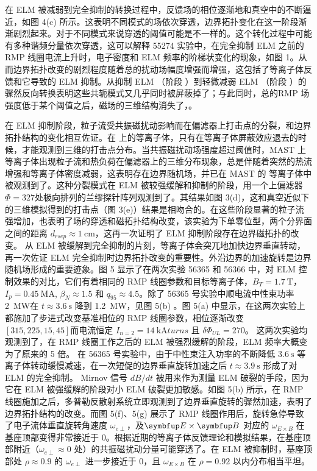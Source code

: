 在 ELM 被减弱到完全抑制的转换过程中，反馈场的相位逐渐地和真空中的不断逼近，如图 4(c) 所示。这表明不同模式的场依次穿透，边界拓扑变化在这一阶段渐渐剧烈起来。对于不同模式来说穿透的阈值可能是不一样的。这个转化过程中可能有多种谐频分量依次穿透，这可以解释 55274 实验中，在完全抑制 ELM 之前的RMP 线圈电流上升时，电子密度和 ELM 频率的阶梯状变化的现象，如图 1。从而边界拓扑改变的剧烈程度随着总的扰动场幅度增强而增强，这包括了等离子体反馈和它导致的 ELM 抑制。从抑制 ELM （阶段 ）到轻微减弱 ELM （阶段 ）的骤然反向转换表明这些共轭模式又几乎同时被屏蔽掉了；与此同时，总的RMP 场强度低于某个阈值之后，磁场的三维结构消失了，。

在 ELM 抑制阶段，粒子流受共振磁扰动影响而在偏滤器上打击点的分裂，和边界拓扑结构的变化相互佐证。在 \ddd 上的\Lmode 等离子体，只有在等离子体屏蔽效应退去的时候，才能观测到三维的打击点分布。当共振磁扰动场强度超过阈值时，MAST 上\Lmode 等离子体出现粒子流和热负荷在偏滤器上的三维分布现象，总是伴随着突然的热流增强和等离子体密度减弱，这表明存在边界随机场，并已在 MAST 的 \Lmode 等离子体中被观测到了。这种分裂模式在 ELM 被较强缓解和抑制的阶段，用一个上偏滤器 $\Phi =327$\degree  处极向排列的兰缪探针阵列观测到了。其结果如图 3(d)，这和真空近似下的三维模拟得到的打击点（图 3(e)）结果是相吻合的。在这些阶段显著的粒子流强增加，也表明了场的穿透和磁拓扑结构改变，该实验为下单零位型，两个分界面之间的距离 $d_{rsep}\approx \SI{1}{\centi\metre}$，这再一次证明了 ELM 抑制阶段存在边界磁拓扑的改变。
从 ELM 被缓解到完全抑制的片刻，等离子体会突兀地加快边界垂直转动，再一次佐证 ELM 完全抑制时边界拓扑改变的重要性。外沿边界的加速旋转是边界随机场形成的重要迹象。图 5 显示了在两次实验 56365 和 56366 中，对 ELM 控制效果的对比，它们有着相同的 RMP 线圈参数和目标等离子体，$B_T=\SI{1.7}{\tesla}$，$I_p=\SI{0.45}{\mega\ampere}$, $\beta_N \approx 1.5$ 和 $q_{95}\approx 4.5$。除了 56365 号实验中顺电流中性束功率 \SI{2}{\mega\watt}在 $t\approx \SI{3.6}{\second}$ 降到 \SI{1.2}{\mega\watt}，见图 5(b) 。图 5(a) 中显示，在这两次实验上都施加了步进式改变基准相位的 RMP 线圈参数，相位逐渐改变 $[315,225,15,45]$\degree 而电流恒定 $I_{n=2}=\SI{14}{\kilo\ampere turns}$ 且 $\delta\Phi_{UL}=270$\degree。
这两次实验均观测到了，在 RMP 线圈工作之后的 ELM 被强烈缓解的阶段，ELM 频率大概变为了原来的 5 倍。 在 56365 号实验中，由于中性束注入功率的不断降低 $\SI{3.6}{\second}$ 等离子体转动缓慢减速，在一次短促的边界垂直旋转加速之后 $t\approx \SI{3.9}{\second}$ 形成了对 ELM 的完全抑制。 Mirnov 信号 $dB/dt$ 被用来作为测量 ELM 破裂的手段，因为它在 ELM 被强缓解的阶段对小 ELM 破裂更加敏感。如图 5(b) 所示，在 RMP 线圈施加之后，多普勒反散射系统立即观测到了边界垂直旋转的骤然加速，表明了边界拓扑结构的改变。而图 5(f)、5(g) 展示了 RMP 线圈作用后，旋转急停导致了电子流体垂直旋转角速度 $\omega_{e\perp}$，及$\vect{E}\times\vect{B}$ 对应的 $\omega_{E\times B}$ 在基座顶部变得非常接近于 0。根据近期的等离子体反馈理论和模拟结果，在基座顶部附近（$\omega_{e\perp}\approx 0$ 处）的共振磁扰动分量可能穿透了。在 ELM 被抑制时，基座顶部处 $\rho \approx 0.9$ 的 $\omega_{e\perp}$ 进一步接近于 0，且 $\omega_{E\times B}$ 在 $\rho=0.92$ 以内分布相当平坦。
